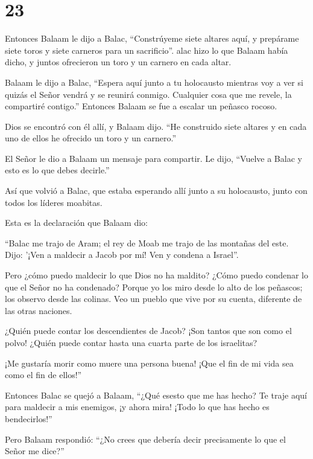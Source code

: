 \hypertarget{section-22}{%
\section{23}\label{section-22}}

 Entonces Balaam le dijo a Balac, ``Constrúyeme siete
altares aquí, y prepárame siete toros y siete carneros para un
sacrificio''.  alac hizo lo que Balaam había dicho, y juntos
ofrecieron un toro y un carnero en cada altar.

 Balaam le dijo a Balac, ``Espera aquí junto a tu holocausto
mientras voy a ver si quizás el Señor vendrá y se reunirá conmigo.
Cualquier cosa que me revele, la compartiré contigo.'' Entonces Balaam
se fue a escalar un peñasco rocoso.

 Dios se encontró con él allí, y Balaam dijo. ``He
construido siete altares y en cada uno de ellos he ofrecido un toro y un
carnero.''

 El Señor le dio a Balaam un mensaje para compartir. Le
dijo, ``Vuelve a Balac y esto es lo que debes decirle.''

 Así que volvió a Balac, que estaba esperando allí junto a
su holocausto, junto con todos los líderes moabitas.

 Esta es la declaración que Balaam dio:

``Balac me trajo de Aram; el rey de Moab me trajo de las montañas del
este. Dijo: '¡Ven a maldecir a Jacob por mí! Ven y condena a Israel''.

 Pero ¿cómo puedo maldecir lo que Dios no ha maldito? ¿Cómo
puedo condenar lo que el Señor no ha condenado?  Porque yo
los miro desde lo alto de los peñascos; los observo desde las colinas.
Veo un pueblo que vive por su cuenta, diferente de las otras naciones.

 ¿Quién puede contar los descendientes de Jacob? ¡Son
tantos que son como el polvo! ¿Quién puede contar hasta una cuarta parte
de los israelitas?

¡Me gustaría morir como muere una persona buena! ¡Que el fin de mi vida
sea como el fin de ellos!''

 Entonces Balac se quejó a Balaam, ``¿Qué esesto que me has
hecho? Te traje aquí para maldecir a mis enemigos, ¡y ahora mira! ¡Todo
lo que has hecho es bendecirlos!''

 Pero Balaam respondió: ``¿No crees que debería decir
precisamente lo que el Señor me dice?''

